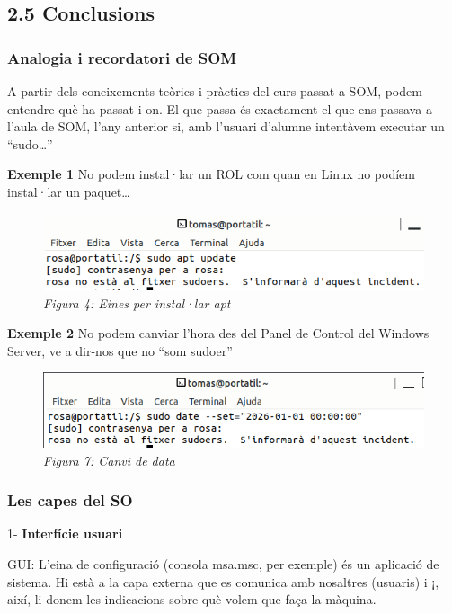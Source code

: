 \documentclass[
  a4paper,
]{article}
\begin{document}
\subsection{2.5 Conclusions}\label{conclusions}

\subsubsection{Analogia i recordatori de
SOM}\label{analogia-i-recordatori-de-som}

A partir dels coneixements teòrics i pràctics del curs passat a SOM,
podem entendre què ha passat i on. El que passa és exactament el que ens
passava a l'aula de SOM, l'any anterior si, amb l'usuari d'alumne
intentàvem executar un ``sudo\ldots{}''

\textbf{Exemple 1} No podem instal·lar un ROL com quan en Linux no
podíem instal·lar un paquet\ldots{}

\begin{figure}
\centering
\includegraphics{png/rosaUpdate.png}
\caption{\emph{Figura 4: Eines per instal·lar apt}}
\end{figure}

\textbf{Exemple 2} No podem canviar l'hora des del Panel de Control del
Windows Server, ve a dir-nos que no ``som sudoer''

\begin{figure}
\centering
\includegraphics{png/rosaHora.png}
\caption{\emph{Figura 7: Canvi de data}}
\end{figure}

\subsubsection{Les capes del SO}\label{les-capes-del-so}

1- \textbf{Interfície usuari}

GUI: L'eina de configuració (consola msa.msc, per exemple) és un
aplicació de sistema. Hi està a la capa externa que es comunica amb
nosaltres (usuaris) i ¡, així, li donem les indicacions sobre què volem
que faça la màquina.
\end{document}
